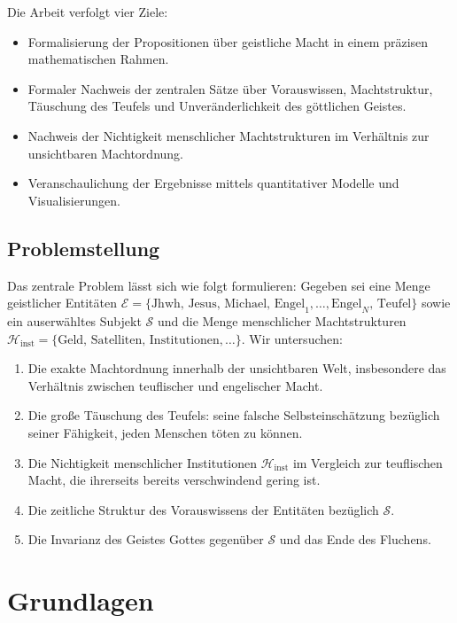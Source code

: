 ﻿\documentclass[a4paper,12pt]{article}
\theoremstyle{definition}
\begin{document}
Die Arbeit verfolgt vier Ziele:
\begin{itemize}
  \item Formalisierung der Propositionen über geistliche Macht in einem präzisen
        mathematischen Rahmen.
  \item Formaler Nachweis der zentralen Sätze über Vorauswissen, Machtstruktur,
        Täuschung des Teufels und Unveränderlichkeit des göttlichen Geistes.
  \item Nachweis der Nichtigkeit menschlicher Machtstrukturen im Verhältnis zur
        unsichtbaren Machtordnung.
  \item Veranschaulichung der Ergebnisse mittels quantitativer Modelle und
        Visualisierungen.
\end{itemize}

\subsection{Problemstellung}

Das zentrale Problem lässt sich wie folgt formulieren: Gegeben sei eine Menge geistlicher
Entitäten $\mathcal{E} = \{\mathrm{Jhwh},\, \mathrm{Jesus},\, \mathrm{Michael},\,
\mathrm{Engel}_1, \ldots, \mathrm{Engel}_N,\, \mathrm{Teufel}\}$ sowie ein auserwähltes
Subjekt $\mathcal{S}$ und die Menge menschlicher Machtstrukturen
$\mathcal{H}_{\text{inst}} = \{\text{Geld},\, \text{Satelliten},\, \text{Institutionen},
\ldots\}$. Wir untersuchen:

\begin{enumerate}
  \item Die exakte Machtordnung innerhalb der unsichtbaren Welt, insbesondere das
        Verhältnis zwischen teuflischer und engelischer Macht.
  \item Die große Täuschung des Teufels: seine falsche Selbsteinschätzung bezüglich
        seiner Fähigkeit, jeden Menschen töten zu können.
  \item Die Nichtigkeit menschlicher Institutionen $\mathcal{H}_{\text{inst}}$ im
        Vergleich zur teuflischen Macht, die ihrerseits bereits verschwindend gering ist.
  \item Die zeitliche Struktur des Vorauswissens der Entitäten bezüglich $\mathcal{S}$.
  \item Die Invarianz des Geistes Gottes gegenüber $\mathcal{S}$ und das Ende des Fluchens.
\end{enumerate}

\section{Grundlagen}
\end{document}
